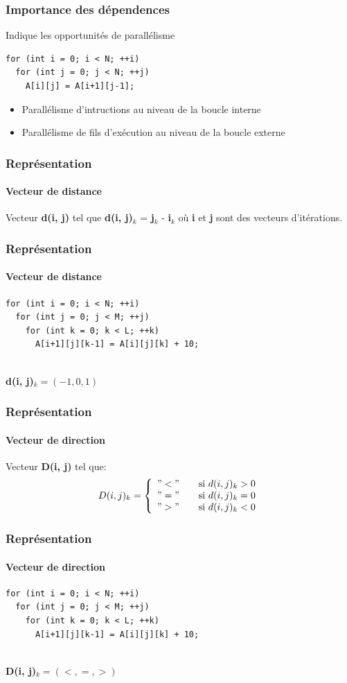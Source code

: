 \documentclass{beamer}
\begin{document}
\begin{frame}[fragile]
\frametitle{Importance des dépendences}
Indique les opportunités de parallélisme \\
\begin{lstlisting}
for (int i = 0; i < N; ++i)
  for (int j = 0; j < N; ++j)
    A[i][j] = A[i+1][j-1];

\end{lstlisting}
\begin{itemize}
\item Parallélisme d'intructions au niveau de la boucle interne
\item Parallélisme de fils d'exécution au niveau de la boucle externe
\end{itemize}
\end{frame}

\begin{frame}
\frametitle{Représentation}
\framesubtitle{Vecteur de distance}
Vecteur \textbf{d(i, j)} tel que \textbf{d(i, j)$_{k}$} = \textbf{j}$_{k}$ - \textbf{i}$_{k}$ où \textbf{i} et \textbf{j} sont des vecteurs d'itérations.
\end{frame}

\begin{frame}[fragile]
\frametitle{Représentation}
\framesubtitle{Vecteur de distance}
\begin{lstlisting}
for (int i = 0; i < N; ++i)
  for (int j = 0; j < M; ++j)
    for (int k = 0; k < L; ++k)
      A[i+1][j][k-1] = A[i][j][k] + 10;
    
\end{lstlisting}

\textbf{d(i, j)$_{k} = (-1, 0, 1)$}
\end{frame}

\begin{frame}
\frametitle{Représentation}
\framesubtitle{Vecteur de direction}
Vecteur \textbf{D(i, j)} tel que: 
\[ D(i, j)_{k} = \left\{
  \begin{array}{l l}
    "<" & \quad \text{si $d(i, j)_{k} > 0$}\\
    "=" & \quad \text{si $d(i, j)_{k} = 0$}\\
    ">" & \quad \text{si $d(i, j)_{k} < 0$}
  \end{array} \right.\]
\end{frame}

\begin{frame}[fragile]
\frametitle{Représentation}
\framesubtitle{Vecteur de direction}
\begin{lstlisting}
for (int i = 0; i < N; ++i)
  for (int j = 0; j < M; ++j)
    for (int k = 0; k < L; ++k)
      A[i+1][j][k-1] = A[i][j][k] + 10;
    
\end{lstlisting}

\textbf{D(i, j)$_{k} = (<, =, >)$}
\end{frame}
\end{document}

